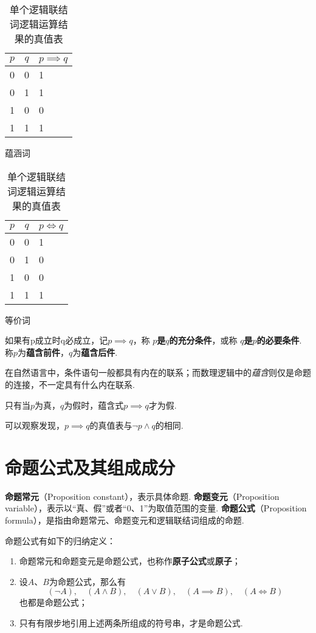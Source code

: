 \begin{table}[ht]
\begin{subtable}[ht]{0.45\textwidth}
\centering
\begin{tabular}{|*{2}{c|}p{2cm}|}
\hline
\(p\) & \(q\) & \(p \implies q\) \\ \hline
0 & 0 & 1 \\ \hline
0 & 1 & 1 \\ \hline
1 & 0 & 0 \\ \hline
1 & 1 & 1 \\ \hline
\end{tabular}
\caption{蕴涵词}
\end{subtable}
\begin{subtable}[ht]{0.45\textwidth}
\centering
\begin{tabular}{|*{2}{c|}p{2cm}|}
\hline
\(p\) & \(q\) & \(p \iff q\) \\ \hline
0 & 0 & 1 \\ \hline
0 & 1 & 0 \\ \hline
1 & 0 & 0 \\ \hline
1 & 1 & 1 \\ \hline
\end{tabular}
\caption{等价词}
\end{subtable}

\caption{单个逻辑联结词逻辑运算结果的真值表}
\end{table}

\begin{definition}
如果有p成立时q必成立，记\(p \implies q\)，称\textbf{ \(p\)是\(q\)的充分条件}，或称\textbf{ \(q\)是\(p\)的必要条件}.
称\(p\)为\textbf{蕴含前件}，\(q\)为\textbf{蕴含后件}.
\end{definition}

在自然语言中，条件语句一般都具有内在的联系；而数理逻辑中的\emph{蕴含}则仅是命题的连接，不一定具有什么内在联系.

\begin{property}
只有当\(p\)为真，\(q\)为假时，蕴含式\(p \implies q\)才为假.
\end{property}
可以观察发现，\(p \implies q\)的真值表与\(\neg p \land q\)的相同.

\section{命题公式及其组成成分}
\begin{definition}
\textbf{命题常元}（Proposition constant），表示具体命题.
\textbf{命题变元}（Proposition variable），表示以“真、假”或者“0、1”为取值范围的变量.
\textbf{命题公式}（Proposition formula），是指由命题常元、命题变元和逻辑联结词组成的命题.

命题公式有如下的归纳定义：
\begin{enumerate}
\item 命题常元和命题变元是命题公式，也称作\textbf{原子公式}或\textbf{原子}；
\item 设\(A\)、\(B\)为命题公式，那么有\[
(\neg A),\quad (A \land B),\quad (A \lor B),\quad (A \implies B),\quad (A \iff B)
\]也都是命题公式；
\item 只有有限步地引用上述两条所组成的符号串，才是命题公式.
\end{enumerate}
\end{definition}

